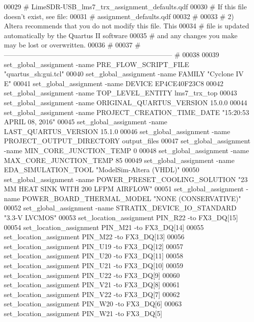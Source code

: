 \begin{DoxyCode}
00029 \textcolor{keyword}{#       LimeSDR-USB\_lms7\_trx\_assignment\_defaults.qdf}
00030 \textcolor{keyword}{#    If this file doesn't exist, see file:}
00031 \textcolor{keyword}{#       assignment\_defaults.qdf}
00032 \textcolor{keyword}{#}
00033 \textcolor{keyword}{# 2) Altera recommends that you do not modify this file. This}
00034 \textcolor{keyword}{#    file is updated automatically by the Quartus II software}
00035 \textcolor{keyword}{#    and any changes you make may be lost or overwritten.}
00036 \textcolor{keyword}{#}
00037 \textcolor{keyword}{# -------------------------------------------------------------------------- #}
00038 
00039 set\_global\_assignment -name PRE\_FLOW\_SCRIPT\_FILE "quartus\_sh:gui.tcl"
00040 set\_global\_assignment -name FAMILY "Cyclone IV E"
00041 set\_global\_assignment -name DEVICE EP4CE40F23C8
00042 set\_global\_assignment -name TOP\_LEVEL\_ENTITY lms7\_trx\_top
00043 set\_global\_assignment -name ORIGINAL\_QUARTUS\_VERSION \textcolor{vhdllogic}{15}.\textcolor{vhdllogic}{0}.\textcolor{vhdllogic}{0}
00044 set\_global\_assignment -name PROJECT\_CREATION\_TIME\_DATE "15:\textcolor{vhdllogic}{20}:\textcolor{vhdllogic}{53}  APRIL \textcolor{vhdllogic}{08}, 2016"
00045 set\_global\_assignment -name LAST\_QUARTUS\_VERSION \textcolor{vhdllogic}{15}.\textcolor{vhdllogic}{1}.\textcolor{vhdllogic}{0}
00046 set\_global\_assignment -name PROJECT\_OUTPUT\_DIRECTORY output\_files
00047 set\_global\_assignment -name MIN\_CORE\_JUNCTION\_TEMP \textcolor{vhdllogic}{0}
00048 set\_global\_assignment -name MAX\_CORE\_JUNCTION\_TEMP \textcolor{vhdllogic}{85}
00049 set\_global\_assignment -name EDA\_SIMULATION\_TOOL "ModelSim-Altera (VHDL)"
00050 set\_global\_assignment -name POWER\_PRESET\_COOLING\_SOLUTION "23 MM HEAT SINK \textcolor{keywordflow}{WITH} \textcolor{vhdllogic}{200} LFPM AIRFLOW"
00051 set\_global\_assignment -name POWER\_BOARD\_THERMAL\_MODEL "NONE (CONSERVATIVE)"
00052 set\_global\_assignment -name STRATIX\_DEVICE\_IO\_STANDARD "3.3-V LVCMOS"
00053 set\_location\_assignment PIN\_R22 -to FX3\_DQ[15]
00054 set\_location\_assignment PIN\_M21 -to FX3\_DQ[14]
00055 set\_location\_assignment PIN\_M22 -to FX3\_DQ[13]
00056 set\_location\_assignment PIN\_U19 -to FX3\_DQ[12]
00057 set\_location\_assignment PIN\_U20 -to FX3\_DQ[11]
00058 set\_location\_assignment PIN\_U21 -to FX3\_DQ[10]
00059 set\_location\_assignment PIN\_U22 -to FX3\_DQ[9]
00060 set\_location\_assignment PIN\_V21 -to FX3\_DQ[8]
00061 set\_location\_assignment PIN\_V22 -to FX3\_DQ[7]
00062 set\_location\_assignment PIN\_W20 -to FX3\_DQ[6]
00063 set\_location\_assignment PIN\_W21 -to FX3\_DQ[5]

\end{DoxyCode}
